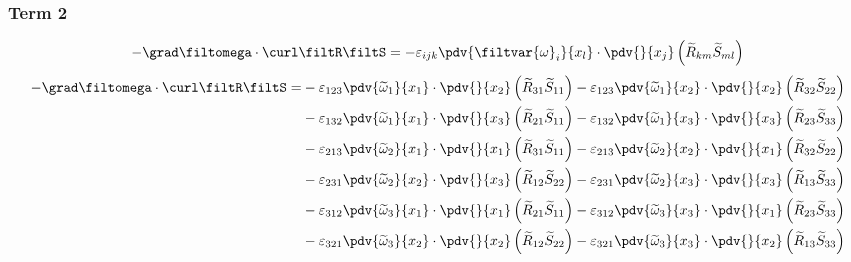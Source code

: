 \subsubsection{Term 2}
\begin{equation}
    -\grad \filtomega \cdot \curl \filtR \filtS =
        -\varepsilon_{ijk} \pdv{\filtvar{\omega}_{i}}{x_{l}} \cdot
        \pdv{}{x_{j}}\left(\widetilde{R}_{km} \widetilde{S}_{ml}\right)
\end{equation}
\begin{equation}
    \begin{split}
        - \grad \filtomega \cdot \curl \filtR \filtS = &
               -\varepsilon_{123}\pdv{\widetilde{\omega}_{1}}{x_{1}}\cdot\pdv{}{x_{2}}\left(\widetilde{R}_{31}\widetilde{S}_{11}\right)
               -\varepsilon_{123}\pdv{\widetilde{\omega}_{1}}{x_{2}}\cdot\pdv{}{x_{2}}\left(\widetilde{R}_{32}\widetilde{S}_{22}\right)\\
        &      -\varepsilon_{132}\pdv{\widetilde{\omega}_{1}}{x_{1}}\cdot\pdv{}{x_{3}}\left(\widetilde{R}_{21}\widetilde{S}_{11}\right)
               -\varepsilon_{132}\pdv{\widetilde{\omega}_{1}}{x_{3}}\cdot\pdv{}{x_{3}}\left(\widetilde{R}_{23}\widetilde{S}_{33}\right)\\
        &      -\varepsilon_{213}\pdv{\widetilde{\omega}_{2}}{x_{1}}\cdot\pdv{}{x_{1}}\left(\widetilde{R}_{31}\widetilde{S}_{11}\right)
               -\varepsilon_{213}\pdv{\widetilde{\omega}_{2}}{x_{2}}\cdot\pdv{}{x_{1}}\left(\widetilde{R}_{32}\widetilde{S}_{22}\right)\\
        &      -\varepsilon_{231}\pdv{\widetilde{\omega}_{2}}{x_{2}}\cdot\pdv{}{x_{3}}\left(\widetilde{R}_{12}\widetilde{S}_{22}\right)
               -\varepsilon_{231}\pdv{\widetilde{\omega}_{2}}{x_{3}}\cdot\pdv{}{x_{3}}\left(\widetilde{R}_{13}\widetilde{S}_{33}\right)\\
        &      -\varepsilon_{312}\pdv{\widetilde{\omega}_{3}}{x_{1}}\cdot\pdv{}{x_{1}}\left(\widetilde{R}_{21}\widetilde{S}_{11}\right)
               -\varepsilon_{312}\pdv{\widetilde{\omega}_{3}}{x_{3}}\cdot\pdv{}{x_{1}}\left(\widetilde{R}_{23}\widetilde{S}_{33}\right)\\
        &      -\varepsilon_{321}\pdv{\widetilde{\omega}_{3}}{x_{2}}\cdot\pdv{}{x_{2}}\left(\widetilde{R}_{12}\widetilde{S}_{22}\right)
               -\varepsilon_{321}\pdv{\widetilde{\omega}_{3}}{x_{3}}\cdot\pdv{}{x_{2}}\left(\widetilde{R}_{13}\widetilde{S}_{33}\right)
    \end{split}
\end{equation}

